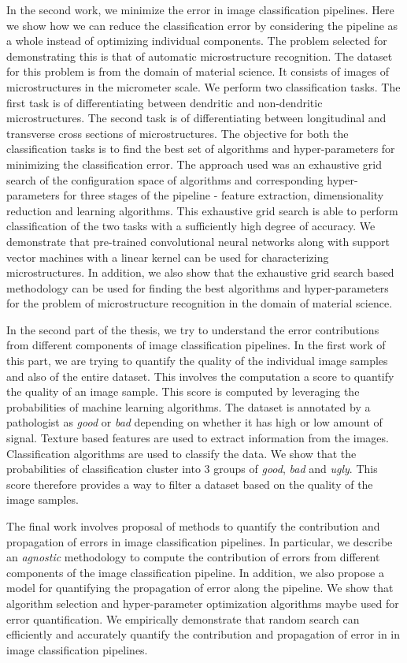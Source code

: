 In the second work, we minimize the error in image classification pipelines. Here we show how we can reduce the classification error by considering the pipeline as a whole instead of optimizing individual components. The problem selected for demonstrating this is that of automatic microstructure recognition. The dataset for this problem is from the domain of material science. It consists of images of microstructures in the micrometer scale. We perform two classification tasks. The first task is of differentiating between dendritic and non-dendritic microstructures. The second task is of differentiating between longitudinal and transverse cross sections of microstructures. The objective for both the classification tasks is to find the best set of algorithms and hyper-parameters for minimizing the classification error. The approach used was an exhaustive grid search of the configuration space of algorithms and corresponding hyper-parameters for three stages of the pipeline - feature extraction, dimensionality reduction and learning algorithms. This exhaustive grid search is able to perform classification of the two tasks with a sufficiently high degree of accuracy. We demonstrate that pre-trained convolutional neural networks along with support vector machines with a linear kernel can be used for characterizing microstructures. In addition, we also show that the exhaustive grid search based methodology can be used for finding the best algorithms and hyper-parameters for the problem of microstructure recognition in the domain of material science.

In the second part of the thesis, we try to understand the  error contributions from different components of  image classification pipelines. In the first work of this part, we are trying to quantify the quality of the individual image samples and also of the  entire dataset. This involves the computation a score to quantify the quality of an image sample. This score is computed by leveraging the probabilities of machine learning algorithms. The dataset is annotated by a pathologist as \textit{good} or \textit{bad} depending on whether it has high or low amount of signal. Texture based features are used to extract information from the images. Classification algorithms are used to classify the data. We show that the probabilities of classification cluster into 3 groups of \textit{good}, \textit{bad} and \textit{ugly}. This score therefore provides a way to filter a dataset based on the quality of the image samples.

The final work involves proposal of methods to quantify the contribution and propagation of errors in image classification pipelines. In particular, we describe an \textit{agnostic} methodology to compute the contribution of errors from different components of the image classification pipeline. In addition, we also propose a model for quantifying the propagation of error along the pipeline. We show that algorithm selection and hyper-parameter optimization algorithms maybe used for error quantification. We empirically demonstrate that random search can efficiently and accurately quantify the contribution and propagation of error in  in image classification pipelines.


